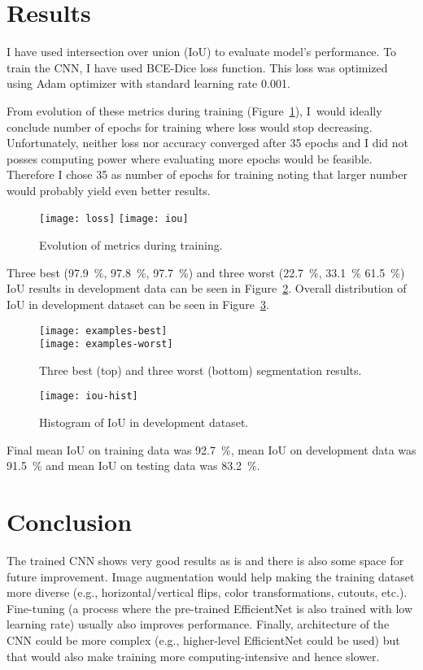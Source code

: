 \documentclass[9pt]{IEEEtran}
\begin{document}
\section{Results}
I have used intersection over union (IoU) to evaluate model's performance.
To train the CNN, I have used BCE-Dice loss function.
This loss was optimized using Adam optimizer with standard learning rate 0.001.

From evolution of these metrics during training (Figure~\ref{fig:evo}), I~would ideally conclude number of epochs for training where loss would stop decreasing.
Unfortunately, neither loss nor accuracy converged after 35 epochs and I did not posses computing power where evaluating more epochs would be feasible.
Therefore I chose 35 as number of epochs for training noting that larger number would probably yield even better results.

\begin{figure}[h]
    \centering
    \texttt{[image: loss]}
    \texttt{[image: iou]}
    \caption{Evolution of metrics during training.}
    \label{fig:evo}
\end{figure}

Three best (97.9~\%, 97.8~\%, 97.7~\%) and three worst (22.7~\%, 33.1~\% 61.5~\%) IoU results in development data can be seen in Figure~\ref{fig:examples}.
Overall distribution of IoU in development dataset can be seen in Figure~\ref{fig:hist}.

\begin{figure}[H]
    \centering
    \texttt{[image: examples-best]}\\
    \vspace{0.5cm}
    \texttt{[image: examples-worst]}
    \caption{Three best (top) and three worst (bottom) segmentation results.}
    \label{fig:examples}
\end{figure}

\begin{figure}[H]
    \centering
    \texttt{[image: iou-hist]}
    \caption{Histogram of IoU in development dataset.}
    \label{fig:hist}
\end{figure}

Final mean IoU on training data was 92.7~\%, mean IoU on development data was 91.5~\% and mean IoU on testing data was 83.2~\%.

\section{Conclusion}
The trained CNN shows very good results as is and there is also some space for future improvement.
Image augmentation would help making the training dataset more diverse (e.g., horizontal/vertical flips, color transformations, cutouts, etc.).
Fine-tuning (a process where the pre-trained EfficientNet is also trained with low learning rate) usually also improves performance.
Finally, architecture of the CNN could be more complex (e.g., higher-level EfficientNet could be used) but that would also make training more computing-intensive and hence slower.



\end{document}
